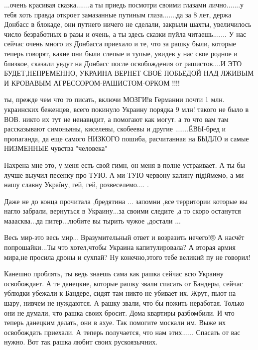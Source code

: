 {%


...очень красивая сказка.......а ты приедь посмотри своими глазами
лично.......у тебя хоть правда откроет замазанные путиным глаза.......да за 8
лет, держа Донбасс в блокаде, они путнего ничего не сделали, закрыли шахты,
увеличилось число безработных в разы и очень, а ты здесь сказки пуйла
читаешь....... У нас сейчас очень много из Донбасса приехало и те, что за рашку
были, которые теперь говорят, какие они были слепые и тупые, увидев у нас свое
родное и близкое, сказали уедут на Донбасс после освобождения от рашистов....И
ЭТО БУДЕТ,НЕПРЕМЕННО, УКРАИНА ВЕРНЕТ СВОЁ ПОБЬЕДОЙ НАД ЛЖИВЫМ И КРОВАВЫМ
АГРЕССОРОМ-РАШИСТОМ-ОРКОМ !!!!


ты, прежде чем что то писать, включи МОЗГИ!в Германии почти 1 млн. украинских
беженцев, всего покинуло Украину порядка 9 млн! такого не было в ВОВ. никто их
тут не ненавидит, а помогают как могут. а то что вам там рассказывают
симоньяны, киселевы, скобеевы и другие .......ЁВЫ-бред и пропаганда, да еще
самого НИЗКОГО пошиба, расчитанная на БЫДЛО и самые НИЗМЕННЫЕ чувства
"человека"

Нахрена мне это, у меня есть свой гимн, он меня в полне устраивает. А ты бы
лучше выучил песенку про ТУЮ. А ми ТУЮ червону калину підіймемо, а ми нашу
славну Україну, гей, гей, розвеселемо.... .


Даже не до конца прочитала ,бредятина ... запомни ,все территории которые вы
нагло забрали, вернуться в Украину...за своими следите ,а то скоро останутся
мааасква...да питер...любите вы тырить чужое ,достали ...


Весь мир-это весь мир...🤦Вразумительный ответ и возразить нечего!🙄🤷А насчёт
попрошайки...Ты что хотел,чтобы Украина капитулировала? А вторая армия мира,не
просила дроны и сухпай? Ну конечно,этого тебе великий пу не говорил!


Канешно проблять, ты ведь знаешь сама как рашка сейчас всю Украину освобождает.
А те данецкие, которые рашку звали спасать от Бандеры, сейчас ублюдки убежали к
Бандере, сидят там никто не убивает их. Жрут, пьют на шару, нивчем не
нуждаются. А рашку звали, что бы пожить неработая. Только они не думали, что
рашка своих бросит. Дома квартиры разбомбили. И что теперь данецким делать, они
в ахуе. Так помогите москали им. Выже их освобождать приехали. А теперь
получается, что нам этих...... Спасать от вас нужно. Вот так рашка любит своих
рускоязычних.

}
